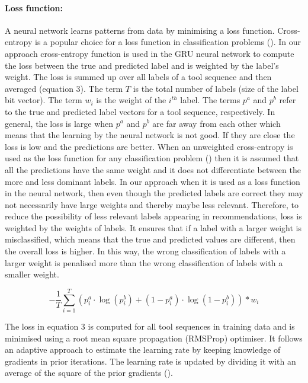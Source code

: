 \documentclass{bioinfo}
\begin{document}
\paragraph*{Loss function:}
A neural network learns patterns from data by minimising a loss function. Cross-entropy is a popular choice for a loss function in classification problems (\cite{Janocha2017OnLF}). In our approach cross-entropy function is used in the GRU neural network to compute the loss between the true and predicted label and is weighted by the label's weight. The loss is summed up over all labels of a tool sequence and then averaged (equation 3). The term $T$ is the total number of labels (size of the label bit vector). The term $w_i$ is the weight of the $i^{th}$ label. The terms $p^a$ and $p^b$ refer to the true and predicted label vectors for a tool sequence, respectively. In general, the loss is large when $p^a$ and $p^b$ are far away from each other which means that the learning by the neural network is not good. If they are close the loss is low and the predictions are better. When an unweighted cross-entropy is used as the loss function for any classification problem (\cite{Sadowski}) then it is assumed that all the predictions have the same weight and it does not differentiate between the more and less dominant labels. In our approach when it is used as a loss function in the neural network, then even though the predicted labels are correct they may not necessarily have large weights and thereby maybe less relevant. Therefore, to reduce the possibility of less relevant labels appearing in recommendations, loss is weighted by the weights of labels. It ensures that if a label with a larger weight is misclassified, which means that the true and predicted values are different, then the overall loss is higher. In this way, the wrong classification of labels with a larger weight is penalised more than the wrong classification of labels with a smaller weight.

\begin{equation}
- \frac{1}{T} \sum_{i=1}^{T} (p_{i}^a \cdot \log(p^{b}_{i}) + (1 - p_{i}^a) \cdot \log(1 - p^{b}_{i})) * w_i
\end{equation}

The loss in equation 3 is computed for all tool sequences in training data and is minimised using a root mean square propagation (RMSProp) optimiser. It follows an adaptive approach to estimate the learning rate by keeping knowledge of gradients in prior iterations. The learning rate is updated by dividing it with an average of the square of the prior gradients (\cite{RuderS}).
\end{document}
